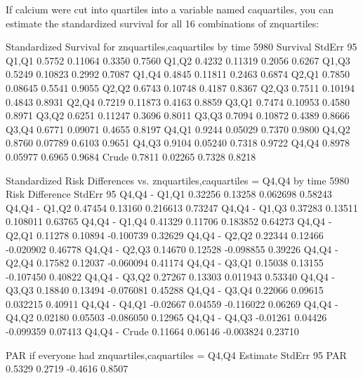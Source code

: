 \documentclass[10pt]{article}
\begin{document}
If calcium were cut into quartiles into a variable named caquartiles, you can estimate the
standardized survival for all 16 combinations of znquartiles:

\begin{Schunk}
\begin{Soutput}
Standardized Survival for znquartiles,caquartiles by time 5980 
      Survival  StdErr 95%
Q1,Q1   0.5752 0.11064      0.3350       0.7560
Q1,Q2   0.4232 0.11319      0.2056       0.6267
Q1,Q3   0.5249 0.10823      0.2992       0.7087
Q1,Q4   0.4845 0.11811      0.2463       0.6874
Q2,Q1   0.7850 0.08645      0.5541       0.9055
Q2,Q2   0.6743 0.10748      0.4187       0.8367
Q2,Q3   0.7511 0.10194      0.4843       0.8931
Q2,Q4   0.7219 0.11873      0.4163       0.8859
Q3,Q1   0.7474 0.10953      0.4580       0.8971
Q3,Q2   0.6251 0.11247      0.3696       0.8011
Q3,Q3   0.7094 0.10872      0.4389       0.8666
Q3,Q4   0.6771 0.09071      0.4655       0.8197
Q4,Q1   0.9244 0.05029      0.7370       0.9800
Q4,Q2   0.8760 0.07789      0.6103       0.9651
Q4,Q3   0.9104 0.05240      0.7318       0.9722
Q4,Q4   0.8978 0.05977      0.6965       0.9684
Crude   0.7811 0.02265      0.7328       0.8218

Standardized Risk Differences vs. znquartiles,caquartiles = Q4,Q4 by time 5980 
              Risk Difference  StdErr 95%
Q4,Q4 - Q1,Q1         0.32256 0.13258    0.062698      0.58243
Q4,Q4 - Q1,Q2         0.47454 0.13160    0.216613      0.73247
Q4,Q4 - Q1,Q3         0.37283 0.13511    0.108011      0.63765
Q4,Q4 - Q1,Q4         0.41329 0.11706    0.183852      0.64273
Q4,Q4 - Q2,Q1         0.11278 0.10894   -0.100739      0.32629
Q4,Q4 - Q2,Q2         0.22344 0.12466   -0.020902      0.46778
Q4,Q4 - Q2,Q3         0.14670 0.12528   -0.098855      0.39226
Q4,Q4 - Q2,Q4         0.17582 0.12037   -0.060094      0.41174
Q4,Q4 - Q3,Q1         0.15038 0.13155   -0.107450      0.40822
Q4,Q4 - Q3,Q2         0.27267 0.13303    0.011943      0.53340
Q4,Q4 - Q3,Q3         0.18840 0.13494   -0.076081      0.45288
Q4,Q4 - Q3,Q4         0.22066 0.09615    0.032215      0.40911
Q4,Q4 - Q4,Q1        -0.02667 0.04559   -0.116022      0.06269
Q4,Q4 - Q4,Q2         0.02180 0.05503   -0.086050      0.12965
Q4,Q4 - Q4,Q3        -0.01261 0.04426   -0.099359      0.07413
Q4,Q4 - Crude         0.11664 0.06146   -0.003824      0.23710

PAR if everyone had znquartiles,caquartiles = Q4,Q4 
    Estimate StdErr 95%
PAR   0.5329 0.2719         -0.4616           0.8507
\end{Soutput}
\end{Schunk}
\end{document}
